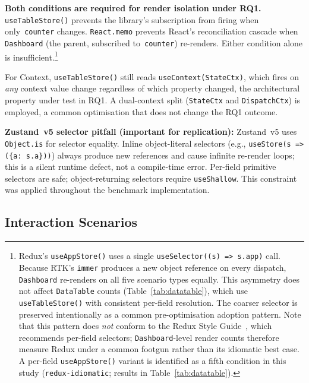 \documentclass[conference]{IEEEtran}
\newcommand{\code}[1]{\texttt{\small #1}}
\begin{document}
\textbf{Both conditions are required for render isolation under RQ1.} \code{useTableStore()} prevents the library's
subscription from firing when only~\code{counter} changes.
\code{React.memo} prevents React's reconciliation cascade when
\code{Dashboard} (the parent, subscribed to~\code{counter}) re-renders.
Either condition alone is insufficient.\footnote{Redux's
\code{useAppStore()} uses a single \code{useSelector((s) => s.app)}
call. Because RTK's \code{immer} produces a new object reference on
every dispatch, \code{Dashboard} re-renders on all five scenario types
equally. This asymmetry does not affect \code{DataTable} counts
(Table~\ref{tab:datatable}), which use \code{useTableStore()} with
consistent per-field resolution. The coarser selector is preserved
intentionally as a common pre-optimisation adoption pattern. Note that
this pattern does \emph{not} conform to the Redux Style Guide~\cite{b7},
which recommends per-field selectors; \code{Dashboard}-level
render counts therefore measure Redux under a common footgun rather than
its idiomatic best case. A per-field \code{useAppStore()} variant is
identified as a fifth condition in this study
(\code{redux-idiomatic}; results in Table~\ref{tab:datatable}).}

For Context, \code{useTableStore()} still reads \code{useContext(StateCtx)},
which fires on \emph{any} context value change regardless of which
property changed, the architectural property under test in RQ1. A
dual-context split (\code{StateCtx} and \code{DispatchCtx}) is employed,
a common optimisation that does not change the RQ1 outcome.

\textbf{Zustand~v5 selector pitfall (important for replication):}
Zustand~v5 uses \code{Object.is} for selector equality. Inline
object-literal selectors (e.g., \code{useStore(s => (\{a: s.a\}))}) always
produce new references and cause infinite re-render loops; this is a
silent runtime defect, not a compile-time error. Per-field primitive
selectors are safe; object-returning selectors require \code{useShallow}.
This constraint was applied throughout the benchmark implementation.

\subsection{Interaction Scenarios}
\label{sec:method-timing}
\end{document}
